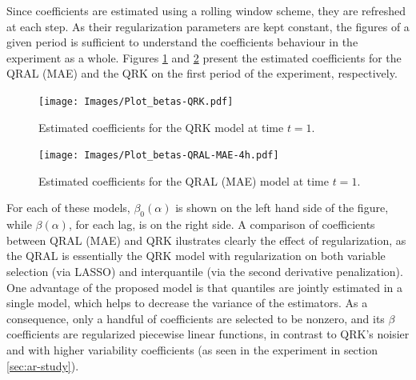 Since coefficients are estimated using a rolling window scheme, they are refreshed at each step. As their regularization parameters are kept constant, the figures of a given period is sufficient  to understand the coefficients behaviour in the experiment as a whole. Figures \ref{fig:betas-qrk} and \ref{fig:betas-MAE} present the estimated coefficients for the QRAL (MAE) and the QRK on the first period of the experiment, respectively.
\begin{figure}
	\centering
	\texttt{[image: Images/Plot\_betas-QRK.pdf]}
	\caption{Estimated coefficients for the QRK model at time $t =1$.}
	\label{fig:betas-qrk}
\end{figure}
\begin{figure}
	\centering
	\texttt{[image: Images/Plot\_betas-QRAL-MAE-4h.pdf]}
	\caption{Estimated coefficients for the QRAL (MAE) model at time $t =1$.}
	\label{fig:betas-MAE}
\end{figure}
For each of these models, $\beta_0(\alpha)$ is shown on the left hand side of the figure, while $\beta(\alpha)$, for each lag, is on the right side. 
A comparison of coefficients between QRAL (MAE) and QRK ilustrates clearly the effect of regularization, as the QRAL is essentially the QRK model with regularization on both variable selection (via LASSO) and interquantile (via the second derivative penalization). 
One advantage of the proposed model is that quantiles are jointly estimated in a single model, which helps to decrease the variance of the estimators. As a consequence, only a handful of coefficients are selected to be nonzero, and its $\beta$ coefficients are regularized piecewise linear functions, in contrast to QRK's noisier and with higher variability coefficients (as seen in the experiment in section \ref{sec:ar-study}). 

